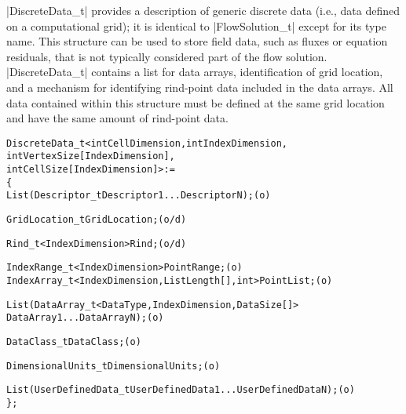 |DiscreteData_t| provides a description of generic discrete data (i.e.,
data defined on a computational grid); it is identical to
|FlowSolution_t| except for its type name.
This structure can be used to store field data, such as fluxes or
equation residuals, that is not typically considered part of the flow
solution.
|DiscreteData_t| contains a list for data arrays, identification of
grid location, and a mechanism for identifying rind-point data included
in the data arrays.
All data contained within this structure must be defined at the same
grid location and have the same amount of rind-point data.
\begin{alltt}
  DiscreteData\_t< int CellDimension, int IndexDimension, 
                  int VertexSize[IndexDimension],
                  int CellSize[IndexDimension] > :=
    \{
    List( Descriptor\_t Descriptor1 ... DescriptorN ) ;                      (o)

    GridLocation\_t GridLocation ;                                           (o/d)

    Rind\_t<IndexDimension> Rind ;                                           (o/d)

    IndexRange\_t<IndexDimension> PointRange ;                               (o)
    IndexArray\_t<IndexDimension, ListLength[], int> PointList ;             (o)

    List( DataArray\_t<DataType, IndexDimension, DataSize[]> 
          DataArray1 ... DataArrayN ) ;                                     (o)

    DataClass\_t DataClass ;                                                 (o)
    
    DimensionalUnits\_t DimensionalUnits ;                                   (o)

    List( UserDefinedData\_t UserDefinedData1 ... UserDefinedDataN ) ;       (o)
    \} ;
\end{alltt}


